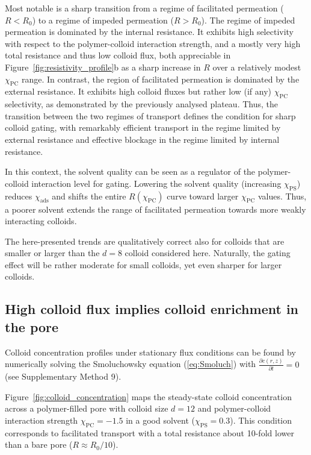 \documentclass[12pt, a4paper]{article}
\begin{document}
Most notable is a sharp transition from a regime of facilitated permeation ($R < R_0$) to a regime of impeded permeation ($R > R_0$).
The regime of impeded permeation is dominated by the internal resistance.
It exhibits high selectivity with respect to the polymer-colloid interaction strength, and a mostly very high total resistance and thus low colloid flux, both appreciable in Figure~\ref{fig:resistivity_profile}b as a sharp increase in $R$ over a relatively modest $\chi_{\text{PC}}$ range.
In contrast, the region of facilitated permeation is dominated by the external resistance. 
It exhibits high colloid fluxes but rather low (if any) $\chi_{\text{PC}}$ selectivity, as demonstrated by the previously analysed plateau.
Thus, the transition between the two regimes of transport defines the condition for sharp colloid gating, with remarkably efficient transport in the regime limited by external resistance and effective blockage in the regime limited by internal resistance.

In this context, the solvent quality can be seen as a regulator of the polymer-colloid interaction level for gating. 
Lowering the solvent quality (increasing $\chi_{\text{PS}}$) reduces $\chi_{\text{ads}}$ and shifts the entire $R(\chi_{\text{PC}})$ curve toward larger $\chi_{\text{PC}}$ values.
Thus, a poorer solvent extends the range of facilitated permeation towards more  weakly interacting colloids.

The here-presented trends are qualitatively correct also for colloids that are smaller or larger than the $d=8$ colloid considered here.
Naturally, the gating effect will be rather moderate for small colloids, yet even sharper for larger colloids.


\subsection{High colloid flux implies colloid enrichment in the pore}

Colloid concentration profiles under stationary flux conditions can be found by numerically solving the Smoluchowsky equation (\ref{eq:Smoluch}) with $\frac{\partial c(r,z)}{\partial t} = 0$  (see Supplementary Method 9). 

Figure~\ref{fig:colloid_concentration} maps the steady-state colloid concentration across a polymer-filled pore with colloid size $d = 12$ and polymer-colloid interaction strength $\chi_{\text{PC}} = -1.5$ in a good solvent ($\chi_{\text{PS}} = 0.3$).
This condition corresponds to facilitated transport with a total resistance about 10-fold lower than a bare pore ($R \approx R_0/10$).
\end{document}
